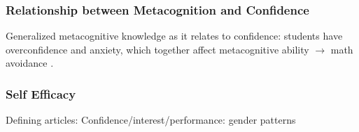 \documentclass{LSRIarticle}
\begin{document}
\subsubsection{Relationship between Metacognition and Confidence}
Generalized metacognitive knowledge as it relates to confidence: students have overconfidence and anxiety, which together affect metacognitive ability $\rightarrow$ math avoidance \parencite{ericksonMetacognitionConfidenceComparing2015}.


\subsubsection{Self Efficacy}

Defining articles: \parencite{hendyMeasurementMathBeliefs2014}
Confidence/interest/performance: gender patterns \parencite{ganleyMathematicsConfidenceInterest2016}





\end{document}
